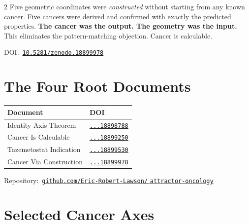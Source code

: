 \documentclass[9.5pt, a4paper]{article}
\begin{document}
\begin{multicols}{2}
{\small
Five geometric coordinates were
\textit{constructed} without starting from
any known cancer. Five cancers were derived
and confirmed with exactly the predicted
properties. \textbf{The cancer was the
output. The geometry was the input.}
This eliminates the pattern-matching
objection. Cancer is calculable.
}

{\footnotesize
DOI:\
\href{https://doi.org/10.5281/zenodo.18899978}
{\texttt{10.5281/zenodo.18899978}}
}

\section{The Four Root Documents}

{\footnotesize
\begin{tabular}{p{3.6cm}p{2.4cm}}
\toprule
\textbf{Document} & \textbf{DOI} \\
\midrule
Identity Axis Theorem &
\href{https://doi.org/10.5281/zenodo.18898788}
{\texttt{...18898788}} \\[0.15em]
Cancer Is Calculable &
\href{https://doi.org/10.5281/zenodo.18899250}
{\texttt{...18899250}} \\[0.15em]
Tazemetostat Indication &
\href{https://doi.org/10.5281/zenodo.18899530}
{\texttt{...18899530}} \\[0.15em]
Cancer Via Construction &
\href{https://doi.org/10.5281/zenodo.18899978}
{\texttt{...18899978}} \\
\bottomrule
\end{tabular}

\smallskip
Repository:\
\href{https://github.com/Eric-Robert-Lawson/attractor-oncology}
{\texttt{github.com/Eric-Robert-Lawson/}
\texttt{attractor-oncology}}
}

\columnbreak


\section{Selected Cancer Axes}


\end{multicols}
\end{document}
